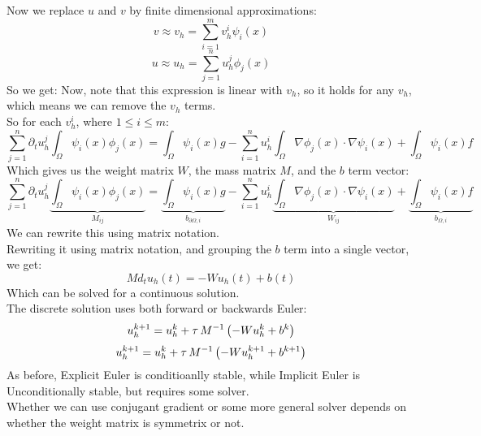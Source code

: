 \documentclass[12pt]{article}
\begin{document}
Now we replace $u$ and $v$ by finite dimensional
approximations:
\[ v \approx v_h = \sum_{i = 1}^m v^i_h \psi_i(x) \]
\[ u \approx u_h = \sum_{j = 1}^n u^j_h \phi_j(x) \]
So we get:
Now, note that this expression is linear with $v_h$,
so it holds for any $v_h$, which means we can remove
the $v_h$ terms. \\
So for each $v_h^i$, where $1 \leq i \leq m$:
\[ \sum_{j = 1}^n \partial_t u^j_h
\int_\Omega \psi_i(x) \phi_j(x) = 
\int_\Omega \psi_i(x)g - \sum_{i = 1}^n u^i_h 
\int_\Omega \nabla \phi_j(x) \cdot \nabla \psi_i(x) + 
\int_\Omega \psi_i(x)f \]
Which gives us the weight matrix $W$, 
the mass matrix $M$,
and the $b$ term vector:
\[ \sum_{j = 1}^n \partial_t u^j_h
\underbrace{\int_\Omega \psi_i(x) \phi_j(x)}_{M_{ij}} = 
\underbrace{\int_\Omega \psi_i(x)g}_{b_{\partial \Omega, i}} 
- \sum_{i = 1}^n u^i_h 
\underbrace{\int_\Omega \nabla \phi_j(x) \cdot 
\nabla \psi_i(x)}_{W_{ij}} + 
\underbrace{\int_\Omega \psi_i(x)f}_{b_{\Omega, i}} \]
We can rewrite this using matrix notation. \\

Rewriting it using matrix notation, and grouping
the $b$ term into a single vector, we get:
\[ M d_tu_h(t) = -Wu_h(t) + b(t) \]
Which can be solved for a continuous solution. \\

The discrete solution uses both forward or backwards Euler:
\[ u_h^{k+1} = u_h^k + \tau \, 
M^{-1} \left(  - W u_h^k + b^k \right) \]
\[ u_h^{k+1} = u_h^k + \tau \, M^{-1} 
\left( - W u_h^{k+1} + b^{k+1} \right) \]
As before, Explicit Euler is conditioanlly stable,
while Implicit Euler is Unconditionally stable,
but requires some solver. \\
Whether we can use conjugant gradient or some more
general solver depends on whether the weight matrix
is symmetrix or not. \\
\end{document}
